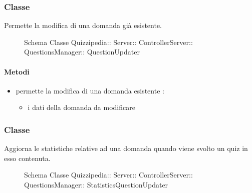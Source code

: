 \subsubsection{Classe }
Permette la modifica di una domanda già esistente.
\begin{figure}[H]
\centering
\noindent{}
\caption[Schema Classe QuestionUpdater]{Schema Classe Quizzipedia:: Server:: ControllerServer:: QuestionsManager:: QuestionUpdater}
\end{figure}
\paragraph{Metodi}
\begin{itemize}
\item {}
\newline
permette la modifica di una domanda esistente
\newline
{} :
\begin{itemize}
\item {}
\newline
i dati della domanda da modificare
\end{itemize}
\end{itemize}
\subsubsection{Classe }
Aggiorna le statistiche relative ad una domanda quando viene svolto un quiz in esso contenuta.
\begin{figure}[H]
\centering
\noindent{}
\caption[Schema Classe StatisticsQuestionUpdater]{Schema Classe Quizzipedia:: Server:: ControllerServer:: QuestionsManager:: StatisticsQuestionUpdater}
\end{figure}
